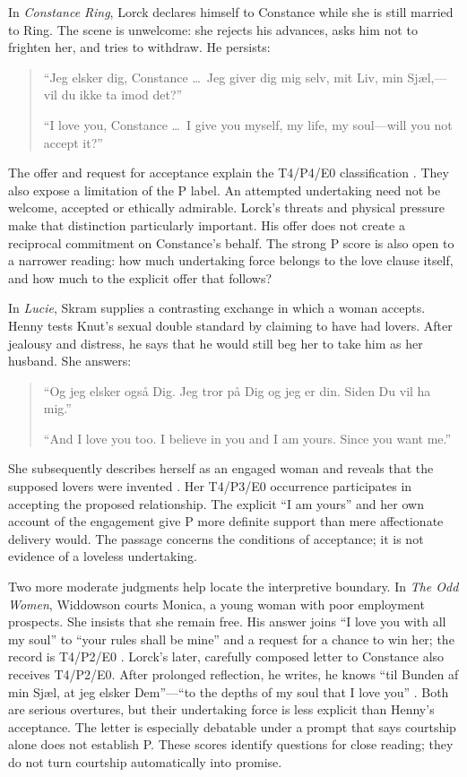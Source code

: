 \documentclass[11pt,a4paper]{article}
\begin{document}
In \emph{Constance Ring}, Lorck declares himself to Constance while she is still married to Ring. The scene is unwelcome: she rejects his advances, asks him not to frighten her, and tries to withdraw. He persists:
\begin{quote}
“Jeg elsker dig, Constance \ldots\ Jeg giver dig mig selv, mit Liv, min Sjæl,---vil du ikke ta imod det?”

“I love you, Constance \ldots\ I give you myself, my life, my soul---will you not accept it?”
\end{quote}
The offer and request for acceptance explain the T4/P4/E0 classification \citep[p.~137]{skramConstance}. They also expose a limitation of the P label. An attempted undertaking need not be welcome, accepted or ethically admirable. Lorck's threats and physical pressure make that distinction particularly important. His offer does not create a reciprocal commitment on Constance's behalf. The strong P score is also open to a narrower reading: how much undertaking force belongs to the love clause itself, and how much to the explicit offer that follows?

In \emph{Lucie}, Skram supplies a contrasting exchange in which a woman accepts. Henny tests Knut's sexual double standard by claiming to have had lovers. After jealousy and distress, he says that he would still beg her to take him as her husband. She answers:
\begin{quote}
“Og jeg elsker også Dig. Jeg tror på Dig og jeg er din. Siden Du vil ha mig.”

“And I love you too. I believe in you and I am yours. Since you want me.”
\end{quote}
She subsequently describes herself as an engaged woman and reveals that the supposed lovers were invented \citep[pp.~176--177]{skramLucie}. Her T4/P3/E0 occurrence participates in accepting the proposed relationship. The explicit “I am yours” and her own account of the engagement give P more definite support than mere affectionate delivery would. The passage concerns the conditions of acceptance; it is not evidence of a loveless undertaking.

Two more moderate judgments help locate the interpretive boundary. In \emph{The Odd Women}, Widdowson courts Monica, a young woman with poor employment prospects. She insists that she remain free. His answer joins “I love you with all my soul” to “your rules shall be mine” and a request for a chance to win her; the record is T4/P2/E0 \citep[chap.~VII]{gissingOddWomen}. Lorck's later, carefully composed letter to Constance also receives T4/P2/E0. After prolonged reflection, he writes, he knows “til Bunden af min Sjæl, at jeg elsker Dem”---“to the depths of my soul that I love you” \citep[p.~309]{skramConstance}. Both are serious overtures, but their undertaking force is less explicit than Henny's acceptance. The letter is especially debatable under a prompt that says courtship alone does not establish P. These scores identify questions for close reading; they do not turn courtship automatically into promise.
\end{document}
